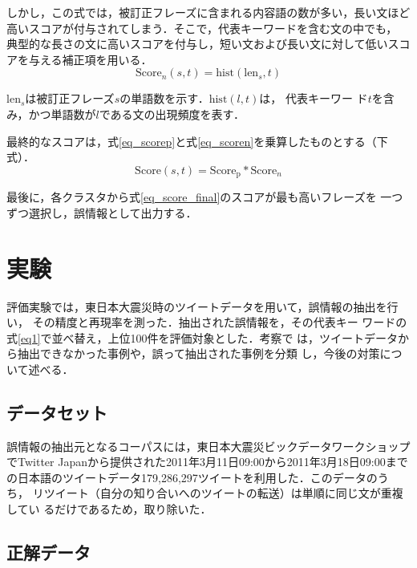 \documentclass[japanese]{jnlp_1.4}
\begin{document}
しかし，この式では，被訂正フレーズに含まれる内容語の数が多い，長い文ほど
高いスコアが付与されてしまう．そこで，代表キーワードを含む文の中でも，
典型的な長さの文に高いスコアを付与し，短い文および長い文に対して低いスコ
アを与える補正項を用いる．
\begin{equation}
 \mathrm{Score}_{n}(s,t) = \mathrm{hist}(\mathrm{len}_s, t) \label{eq_scoren}
\end{equation}

$\mathrm{len}_s$は被訂正フレーズ$s$の単語数を示す．$\mathrm{hist}(l, t)$は，
代表キーワー
ド$t$を含み，かつ単語数が$l$である文の出現頻度を表す．

最終的なスコアは，式\ref{eq_scorep}と式\ref{eq_scoren}を乗算したものとする（下式）．
\begin{equation}
 \mathrm{Score}(s,t) = \mathrm{Score_{p}} * \mathrm{Score}_{n} \label{eq_score_final}
\end{equation}

最後に，各クラスタから式\ref{eq_score_final}のスコアが最も高いフレーズを
一つずつ選択し，誤情報として出力する．



\section{実験}

評価実験では，東日本大震災時のツイートデータを用いて，誤情報の抽出を行い，
その精度と再現率を測った．抽出された誤情報を，その代表キー
ワードの式\ref{eq1}で並べ替え，上位100件を評価対象とした．考察で
は，ツイートデータから抽出できなかった事例や，誤って抽出された事例を分類
し，今後の対策について述べる．



\subsection{データセット}

誤情報の抽出元となるコーパスには，東日本大震災ビックデータワークショップ
でTwitter Japanから提供された2011年3月11日09:00から2011年3月18日09:00まで
の日本語のツイートデータ179,286,297ツイートを利用した．このデータのうち，
リツイート（自分の知り合いへのツイートの転送）は単順に同じ文が重複してい
るだけであるため，取り除いた．



\subsection{正解データ}
\end{document}
